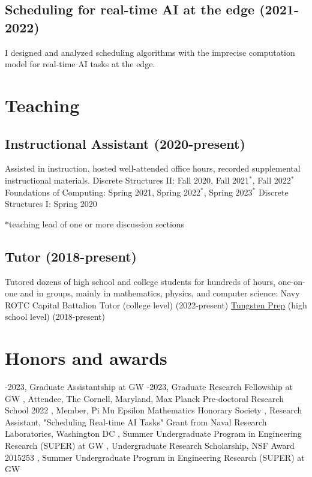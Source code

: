 \documentclass[letterpaper]{article}
\begin{document}
\subsection*{Scheduling for real-time AI at the edge (2021-2022)}
I designed and analyzed scheduling algorithms with the imprecise computation model for real-time AI tasks at the edge. 

\section*{Teaching}
\subsection*{Instructional Assistant (2020-present)}
Assisted in instruction, hosted well-attended office hours, recorded supplemental instructional materials.
\subitem
Discrete Structures II: Fall 2020, Fall 2021$^*$, Fall 2022$^*$
\subitem
Foundations of Computing: Spring 2021, Spring 2022$^*$, Spring 2023$^*$
\subitem
Discrete Structures I: Spring 2020

$*$teaching lead of one or more discussion sections

\subsection*{Tutor (2018-present)}
Tutored dozens of high school and college students for hundreds of hours, one-on-one and in groups, mainly in mathematics, physics, and computer science:
\subitem 
Navy ROTC Capital Battalion Tutor (college level) (2022-present)
\subitem
\href{https://www.tungstenprep.com/}{Tungsten Prep} (high school level) (2018-present) 

\section*{Honors and awards}

-2023, Graduate Assistantship at GW
-2023, Graduate Research Fellowship at GW
, Attendee, The Cornell, Maryland, Max Planck Pre-doctoral Research School 2022
, Member, Pi Mu Epsilon Mathematics Honorary Society
, Research Assistant, "Scheduling Real-time AI Tasks" Grant from Naval Research Laboratories, Washington DC
, Summer Undergraduate Program in Engineering Research (SUPER) at GW
, Undergraduate Research Scholarship, NSF Award 2015253
, Summer Undergraduate Program in Engineering Research (SUPER) at GW
\end{document}
